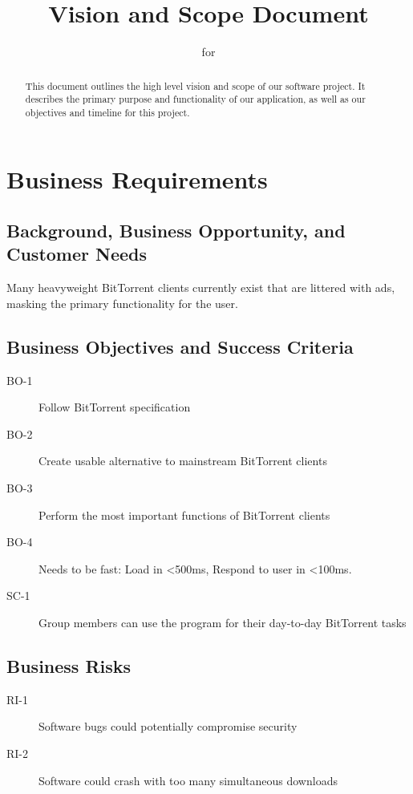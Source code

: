 \documentclass[letter]{scrartcl}
\newcommand{\app}{\sc{393torrent}}
\begin{document}
\title{Vision and Scope Document}
\subtitle{for \app}
\date{} %

\maketitle

\begin{abstract}
This document outlines the high level vision and scope of our software project.  It describes the primary purpose and functionality of our application, as well as our objectives and timeline for this project. 
\end{abstract}

\tableofcontents
\pagebreak

\section{Business Requirements}
\subsection{Background, Business Opportunity, and Customer Needs}
Many heavyweight BitTorrent clients currently exist that are littered with ads, masking the primary functionality for the user.

\subsection{Business Objectives and Success Criteria}
\begin{description}
\item[BO-1] Follow BitTorrent specification
\item[BO-2] Create usable alternative to mainstream BitTorrent clients
\item[BO-3] Perform the most important functions of BitTorrent clients
\item[BO-4] Needs to be fast:
Load in \textless500ms,
Respond to user in \textless100ms.
\item[SC-1] Group members can use the program for their day-to-day BitTorrent tasks
\end{description}

\subsection{Business Risks}
\begin{description}
\item[RI-1] Software bugs could potentially compromise security
\item[RI-2] Software could crash with too many simultaneous downloads
\end{description}
\end{document}
